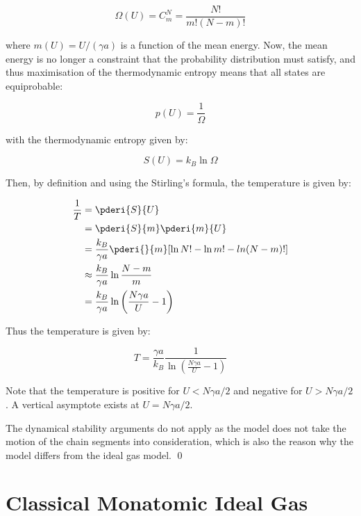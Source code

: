 \documentclass[12pt]{article}
\begin{document}
\begin{equation}
    \Omega(U) = C_{m}^{N} = \frac{N!}{m!(N-m)!}
\end{equation}

where $m(U) = U/(\gamma a)$ is a function of the mean energy. Now, the mean energy is no longer a constraint that the probability distribution must satisfy, and thus maximisation of the thermodynamic entropy means that all states are equiprobable:

\begin{equation}
    p(U) = \frac{1}{\Omega}
\end{equation}

with the thermodynamic entropy given by:

\begin{equation}
    S(U) = k_{B} \ln{\Omega}
\end{equation}

Then, by definition and using the Stirling's formula, the temperature is given by:

\begin{equation}
    \begin{split}
        \frac{1}{T} &= \pderi{S}{U} \\
        &= \pderi{S}{m} \pderi{m}{U} \\
        &= \frac{k_{B}}{\gamma a} \pderi{}{m} [\ln{N!} - \ln{m!} - ln{(N-m)!}] \\
        &\approx \frac{k_{B}}{\gamma a} \ln{\frac{N-m}{m}} \\
        &= \frac{k_{B}}{\gamma a} \ln{\left( \frac{N \gamma a}{U} - 1 \right)}
    \end{split}
\end{equation}

Thus the temperature is given by:

\begin{equation}
    T = \frac{\gamma a}{k_{B}} \frac{1}{\ln{\left( \frac{N \gamma a}{U} - 1 \right)}}
\end{equation}

Note that the temperature is positive for $U < N \gamma a/2$ and negative for $U > N \gamma a/2$. A vertical asymptote exists at $U = N \gamma a/2$.

The dynamical stability arguments do not apply as the model does not take the motion of the chain segments into consideration, which is also the reason why the model differs from the ideal gas model.
\qed


\pagebreak
\section*{Classical Monatomic Ideal Gas}
\end{document}
